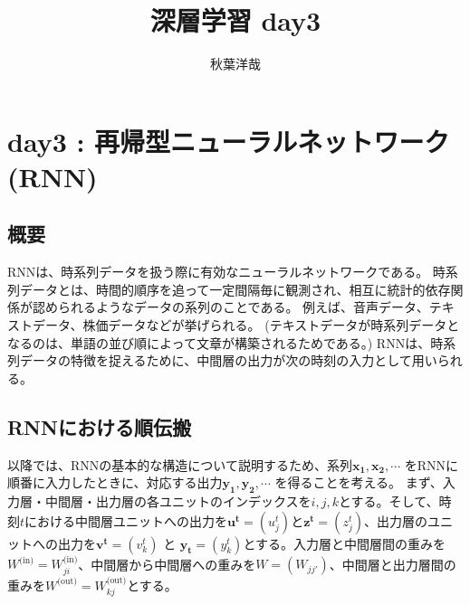 \documentclass{ltjsarticle}
\begin{document}
\title{深層学習 day3}
\author{秋葉洋哉}
\maketitle

\section{day3 : 再帰型ニューラルネットワーク(RNN)}
\subsection{概要}
RNNは、時系列データを扱う際に有効なニューラルネットワークである。
時系列データとは、時間的順序を追って一定間隔毎に観測され、相互に統計的依存関係が認められるようなデータの系列のことである。
例えば、音声データ、テキストデータ、株価データなどが挙げられる。
(テキストデータが時系列データとなるのは、単語の並び順によって文章が構築されるためである。)
RNNは、時系列データの特徴を捉えるために、中間層の出力が次の時刻の入力として用いられる。

\subsection{RNNにおける順伝搬}
以降では、RNNの基本的な構造について説明するため、系列$\mathbf{x_1}, \mathbf{x_2}, \cdots$ をRNNに順番に入力したときに、対応する出力$\mathbf{y_1}, \mathbf{y_2}, \cdots$ を得ることを考える。
まず、入力層・中間層・出力層の各ユニットのインデックスを$i, j, k$とする。そして、時刻$t$における中間層ユニットへの出力を$\mathbf{u^t} = (u^t_j)$と$\mathbf{z^t} = (z^t_j)$、出力層のユニットへの出力を$\mathbf{v^t} = (v^t_k)$ と $\mathbf{y_t}=(y^t_k)$とする。入力層と中間層間の重みを$W^{\text{(in)}} = W^{\text{(in)}}_{ji}$、中間層から中間層への重みを$W = (W_{jj'})$、中間層と出力層間の重みを$W^{\text{(out)}} = W^{\text{(out)}}_{kj}$とする。
\end{document}
